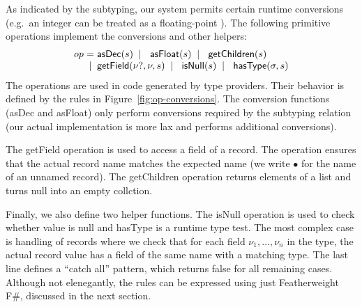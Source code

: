 \documentclass[10pt,preprint,blind,clearpagebib]{sigplanconf}
\newcommand{\kvd}[1]{\textnormal{\textcolor{kvdclr}{\sffamily #1}}}
\newcommand{\num}[1]{\textnormal{\textcolor{numclr}{\sffamily #1}}}
\newcommand{\ident}[1]{\textnormal{\sffamily #1}}
\newcommand{\lsep}[0]{\;\; | \;\;}
\newcommand{\narrow}[1]{\hspace{-0.7em} #1 \hspace{-0.7em}}
\begin{document}
As indicated by the subtyping, our system permits certain runtime conversions (e.g.~an integer
\num{1} can be treated as a floating-point \num{1.0}). The following primitive operations 
implement the conversions and other helpers:
%
\begin{equation*}
\begin{array}{lcl}
 op  &\narrow{=}& \ident{asDec}(s) \lsep \ident{asFloat}(s) \lsep \ident{getChildren}(s) \\
     &\narrow{|}& \ident{getField}(\nu?, \nu, s) \lsep \ident{isNull}(s) \lsep \ident{hasType}(\sigma, s)
\end{array}
\end{equation*}
%
The operations are used in code generated by type providers. Their behavior is defined
by the rules in Figure~\ref{fig:op-conversions}. The conversion functions (\ident{asDec}
and \ident{asFloat}) only perform conversions required by the subtyping relation (our actual 
implementation is more lax and performs additional conversions).

The \ident{getField} operation is used to access a field of a record. The operation ensures that
the actual record name matches the expected name (we write $\bullet$ for the name of an unnamed 
record). The \ident{getChildren} operation returns elements of a list and turns \kvd{null} into 
an empty collction.

Finally, we also define two helper functions. The \ident{isNull} operation is used to check whether 
value is \kvd{null} and \ident{hasType} is a runtime type test. The most complex case is handling 
of records where we check that for each field $\nu_1, \ldots, \nu_n$ in the type, the actual record 
value has a field of the same name with a matching type. The last line defines a ``catch all'' 
pattern, which returns \kvd{false} for all remaining cases. Although not elenegantly, the rules 
can be expressed using just Featherweight F\#, discussed in the next section.

\end{document}
